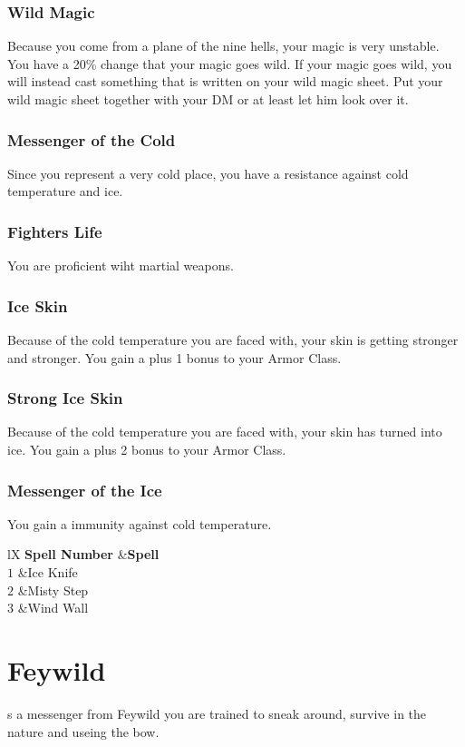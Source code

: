\documentclass[a4paper,10pt,twoside,twocolumn]{dndbook} %
\begin{document}
	\subsection{Wild Magic}
	Because you come from a plane of the nine hells, your magic is very unstable. You have a 20\% change that your magic goes wild. If your magic goes wild, you will instead cast something that is written on your wild magic sheet. Put your wild magic sheet together with your DM or at least let him look over it.
	\subsection{Messenger of the Cold}
	Since you represent a very cold place, you have a resistance against cold temperature and ice.
	\subsection{Fighters Life}
	You are proficient wiht martial weapons.
	\subsection{Ice Skin}
	Because of the cold temperature you are faced with, your skin is getting stronger and stronger. You gain a plus 1 bonus to your Armor Class.
	\subsection{Strong Ice Skin}
	Because of the cold temperature you are faced with, your skin has turned into ice. You gain a plus 2 bonus to your Armor Class.
	\subsection{Messenger of the Ice}
	You gain a immunity against cold temperature.
	\begin{DndTable}[header=Spells]{lX}
		\textbf{Spell Number}	&\textbf{Spell}\\
		$1$						&Ice Knife\\
		$2$						&Misty Step\\
		$3$						&Wind Wall\\
	\end{DndTable}
	\chapter{Feywild}
	s a messenger from Feywild you are trained to sneak around, survive in the nature and useing the bow.
\end{document}
